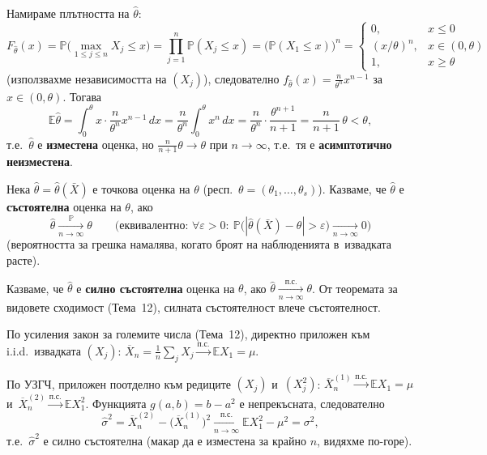 \begin{rembox}[Пример: \texorpdfstring{$X\sim U(0,\theta)$}{X~U(0,тета)}, МПО оценката \texorpdfstring{$\hat\theta=\max_j X_j$}{тета-капа=max Xj}]
Намираме плътността на $\hat\theta$:
\[
  F_{\hat\theta}(x) = \mathbb P\Big(\max_{1\le j\le n}X_j\le x\Big) = \prod_{j=1}^{n}\mathbb P(X_j\le x) = \big(\mathbb P(X_1\le x)\big)^n = \begin{cases}0,&x\le0\\ (x/\theta)^n,&x\in(0,\theta)\\1,&x\ge\theta\end{cases}
\]
(използвахме независимостта на $(X_j)$), следователно $f_{\hat\theta}
(x) = \tfrac n{\theta^n}x^{n-1}$ за $x\in(0,\theta)$. Тогава
\[
  \mathbb E\hat\theta = \int_0^{\theta} x\cdot\frac n{\theta^n}x^{n-1}\,dx = \frac n{\theta^n}\int_0^\theta x^n\,dx = \frac n{\theta^n}\cdot\frac{\theta^{n+1}}{n+1} = \frac{n}{n+1}\,\theta < \theta,
\]
т.е.\ $\hat\theta$ е \textbf{изместена} оценка, но $\tfrac n{n+1}
\theta\to\theta$ при $n\to\infty$, т.е.\ тя е \textbf{асимптотично
неизместена}.
\end{rembox}

\begin{defbox}[~(Състоятелност)]
Нека $\hat\theta=\hat\theta(\bar X)$ е точкова оценка на $\theta$
(респ.\ $\theta=(\theta_1,\dots,\theta_s)$). Казваме, че $\hat\theta$
е \textbf{състоятелна} оценка на $\theta$, ако
\[
  \hat\theta \xrightarrow[n\to\infty]{\mathbb P} \theta
  \qquad
  \Big(\text{еквивалентно: }\forall\varepsilon>0:\ \mathbb P\big(|\hat\theta(\bar X)-\theta|>\varepsilon\big)\xrightarrow[n\to\infty]{}0\Big)
\]
(вероятността за грешка намалява, когато броят на наблюденията в~извадката расте).
\end{defbox}

\begin{defbox}
Казваме, че $\hat\theta$ е \textbf{силно състоятелна} оценка на
$\theta$, ако $\hat\theta\xrightarrow[n\to\infty]{\text{п.с.}}\theta$.
От теоремата за видовете сходимост (Тема~12), силната състоятелност
влече състоятелност.
\end{defbox}

\begin{rembox}[Пример: \texorpdfstring{$\hat\mu=\overline X_n$}{мю-капа=X-чертата} е силно състоятелна]
По усиления закон за големите числа (Тема~12), директно приложен
към i.i.d.\ извадката $(X_j)$: $\overline X_n=\tfrac1n\sum_j X_j
\xrightarrow{\text{п.с.}}\mathbb EX_1=\mu$.
\end{rembox}

\begin{rembox}[Пример: \texorpdfstring{$\hat\sigma^2=\overline X_n^{(2)}-(\overline X_n^{(1)})^2$}{сигма-капа^2} е силно състоятелна]
По УЗГЧ, приложен поотделно към редиците $(X_j)$ и~$(X_j^2)$:
$\overline X_n^{(1)}\xrightarrow{\text{п.с.}}\mathbb EX_1=\mu$ и~$\overline X_n^{(2)}\xrightarrow{\text{п.с.}}\mathbb EX_1^2$.
Функцията $g(a,b)=b-a^2$ е непрекъсната, следователно
\[
  \hat\sigma^2 = \overline X_n^{(2)}-\big(\overline X_n^{(1)}\big)^2 \xrightarrow[n\to\infty]{\text{п.с.}} \mathbb EX_1^2-\mu^2 = \sigma^2,
\]
т.е.\ $\hat\sigma^2$ е силно състоятелна (макар да е изместена за
крайно $n$, видяхме по-горе).
\end{rembox}
